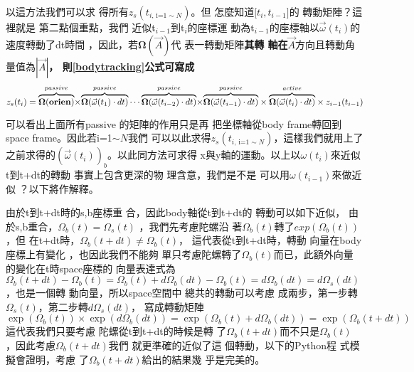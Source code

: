 \documentclass[12pt]{article}
\begin{document}
以這方法我們可以求%
得所有$z_{s}(t_{i\text{, i=1}\sim N})$。但%
怎麼知道$\mathbf{[}t_{i},t_{i-1}\mathbf{]}$的%
轉動矩陣？這裡就是%
第二點個重點，我們%
近似t$_{i-1}$到t$_{i}$的座標運%
動為t$_{i-1}$的座標軸以$\vec{\omega%
}(t_{i})$的速度轉動了dt時間%
，因此，若$\mathbf{\Omega }(\vec{A})$代%
表一轉動矩陣\textbf{其轉%
軸在}$\vec{A}$方向且轉動角%
量值為$\left\vert \vec{A}\right\vert $\textbf{，%
則\ref{bodytracking}公式可寫成}%
\begin{equation}
z_{s}(t_{i})=\overset{passive}{\overbrace{\mathbf{\Omega (orien)}}}\mathbf{%
\times }\overset{passive}{\overbrace{\mathbf{\Omega }(\vec{\omega}%
(t_{1})\cdot dt)}}\cdots \overset{passive}{\overbrace{\mathbf{\Omega }(\vec{%
\omega}(t_{i-2})\cdot dt)}}\mathbf{\times }\overset{passive}{\overbrace{%
\mathbf{\Omega }(\vec{\omega}(t_{i-1})\cdot dt)}}\times \overset{active}{%
\overbrace{\mathbf{\Omega }(\vec{\omega}(t_{i})\cdot dt)}}\times
z_{i-1}(t_{i-1})
\end{equation}%
\bigskip

可以看出上面所有passive%
的矩陣的作用只是再%
把坐標軸從body frame轉回到%
space frame。因此若i=1$\sim N$我們%
可以以此求得$z_{s}(t_{i\text{, i=1}\sim
N})$，這樣我們就用上了%
之前求得的$\left( \vec{\omega}(t_{i})\right)
_{b}$。以此同方法可求得%
x與y軸的運動。以上以$%
\omega (t_{i})$來近似t到t+dt的轉動%
事實上包含更深的物%
理含意，我們是不是%
可以用$\omega (t_{i-1})$來做近似%
？以下將作解釋。

由於t到t+dt時的s,b座標重%
合，因此body軸從t到t+dt的%
轉動可以如下近似，%
由於s,b重合，$\Omega _{b}(t)=\Omega _{s}(t)$%
，我們先考慮陀螺沿%
著$\Omega _{b}(t)$轉了$exp(\Omega _{b}(t))$，但%
在t+dt時，$\Omega _{b}(t+dt)\neq \Omega _{b}(t)$，%
這代表從t到t+dt時，轉動%
向量在body座標上有變化%
，也因此我們不能夠%
單只考慮陀螺轉了$\Omega
_{b}(t)$而已，此額外向量%
的變化在t時space座標的%
向量表達式為$\Omega _{b}(t+dt)-\Omega
_{b}(t)=\Omega _{b}(t)+d\Omega _{b}(dt)-\Omega _{b}(t)=d\Omega
_{b}(dt)=d\Omega _{s}(dt)$，也是一個轉%
動向量，所以space空間中%
總共的轉動可以考慮%
成兩步，第一步轉$\Omega
_{s}(t)$，第二步轉$d\Omega _{s}(dt)$，%
寫成轉動矩陣%
\begin{equation}
\exp (\Omega _{b}(t))\times \exp (d\Omega _{b}(dt))=\exp (\Omega
_{b}(t)+d\Omega _{b}(dt))=\exp (\Omega _{b}(t+dt))
\end{equation}%
這代表我們只要考慮%
陀螺從t到t+dt的時候是轉%
了$\Omega _{b}(t+dt)$而不只是$\Omega _{b}(t)$%
，因此考慮$\Omega _{b}(t+dt)$我們%
就更準確的近似了這%
個轉動，以下的Python程%
式模擬會證明，考慮%
了$\Omega _{b}(t+dt)$給出的結果幾%
乎是完美的。
\end{document}
